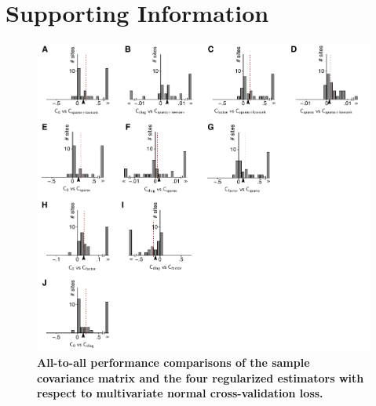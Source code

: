 \documentclass[10pt]{article}
\begin{document}



\newpage
\section*{Supporting Information}
\setcounter{figure}{0}
\renewcommand{\figurename}{Figure S}


\begin{figure}[!ht]
\begin{center}
\includegraphics{./figures/Figure-Supp01.pdf}
\end{center}
\caption{{\bf All-to-all performance comparisons of the sample covariance matrix and the four regularized estimators with respect to multivariate normal cross-validation loss.}
}
\label{supp:01}
\end{figure}
\end{document}
